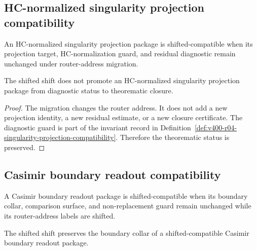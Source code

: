 \subsection{HC-normalized singularity projection compatibility}
\label{subsec:v400-r04-singularity-projection-compatibility}

\begin{definition}
\label{def:v400-r04-singularity-projection-compatibility}
An HC-normalized singularity projection package is shifted-compatible when its
projection target, HC-normalization guard, and residual diagnostic remain
unchanged under router-address migration.
\end{definition}

\begin{proposition}
\label{prop:v400-r04-singularity-projection-status-preservation}
The shifted shift does not promote an HC-normalized singularity projection package
from diagnostic status to theorematic closure.
\end{proposition}

\begin{proof}
The migration changes the router address. It does not add a new projection
identity, a new residual estimate, or a new closure certificate. The
diagnostic guard is part of the invariant record in
Definition~\ref{def:v400-r04-singularity-projection-compatibility}. Therefore
the theorematic status is preserved.
\end{proof}

\subsection{Casimir boundary readout compatibility}
\label{subsec:v400-r04-casimir-boundary-readout-compatibility}

\begin{definition}
\label{def:v400-r04-casimir-boundary-compatibility}
A Casimir boundary readout package is shifted-compatible when its boundary collar,
comparison surface, and non-replacement guard remain unchanged while its
router-address labels are shifted.
\end{definition}

\begin{lemma}
\label{lem:v400-r04-casimir-boundary-collar-preservation}
The shifted shift preserves the boundary collar of a shifted-compatible Casimir boundary
readout package.
\end{lemma}

